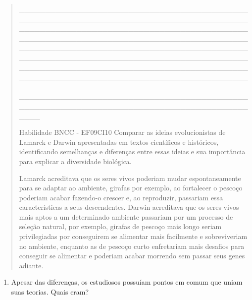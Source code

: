 \begin{quote}
\_\_\_\_\_\_\_\_\_\_\_\_\_\_\_\_\_\_\_\_\_\_\_\_\_\_\_\_\_\_\_\_\_\_\_\_\_\_\_\_\_\_\_\_\_\_\_\_\_\_\_\_\_\_\_\_\_\_\_\_\_\_\_\_\_\_\_\_\_\_\_\_\_\_\_\_\_\_\_\_\_\_\_\_\_\_\_\_\_\_\_\_\_\_\_\_\_\_\_\_\_\_\_\_\_\_\_\_\_\_\_\_\_\_\_\_\_\_\_\_\_\_\_\_\_\_\_\_\_\_\_\_\_\_\_\_\_\_\_\_\_\_\_\_\_\_\_\_\_\_\_\_\_\_\_\_\_\_\_\_\_\_\_\_\_\_\_\_\_\_\_\_\_\_\_\_\_\_\_\_\_\_\_\_\_\_\_\_\_\_\_\_\_\_\_\_\_\_\_\_\_\_\_\_\_\_\_\_\_\_\_\_\_\_\_\_\_\_\_\_\_\_\_\_\_\_\_\_\_\_\_\_\_\_\_\_\_\_\_\_\_\_\_\_\_\_\_\_\_\_\_\_\_\_\_\_\_\_\_\_\_\_\_\_\_\_\_\_\_\_\_\_\_\_\_\_\_\_\_\_\_\_\_\_\_\_\_\_\_\_\_\_\_\_\_\_\_\_\_\_\_\_\_\_\_\_\_\_\_\_\_\_\_\_\_\_\_\_\_\_\_\_\_\_\_\_\_\_\_\_\_\_\_\_\_\_\_\_\_\_\_\_\_\_\_\_\_\_\_\_\_\_\_\_\_\_\_\_\_\_\_\_\_\_\_\_\_\_\_\_\_\_\_\_\_\_\_\_\_\_\_\_\_\_\_\_\_\_\_\_\_\_\_\_\_\_\_\_\_\_\_\_\_\_\_\_\_\_\_\_\_\_\_\_\_\_\_\_\_\_\_\_\_\_\_\_\_\_\_\_\_\_\_\_\_\_\_\_\_\_\_\_\_\_\_\_\_\_\_\_\_\_\_\_\_\_\_\_\_\_\_\_\_\_\_\_\_\_\_\_\_\_\_\_\_\_\_\_\_\_\_\_\_\_\_\_\_\_

Habilidade BNCC - EF09CI10 Comparar as ideias evolucionistas de Lamarck
e Darwin apresentadas em textos científicos e históricos, identificando
semelhanças e diferenças entre essas ideias e sua importância para
explicar a diversidade biológica.

Lamarck acreditava que os seres vivos poderiam mudar espontaneamente
para se adaptar ao ambiente, girafas por exemplo, ao fortalecer o
pescoço poderiam acabar fazendo-o crescer e, ao reproduzir, passariam
essa características a seus descendentes. Darwin acreditava que os seres
vivos mais aptos a um determinado ambiente passariam por um processo de
seleção natural, por exemplo, girafas de pescoço mais longo seriam
privilegiadas por conseguirem se alimentar mais facilmente e
sobreviveriam no ambiente, enquanto as de pescoço curto enfretariam mais
desafios para conseguir se alimentar e poderiam acabar morrendo sem
passar seus genes adiante.
\end{quote}

\begin{enumerate}
\def\labelenumi{\alph{enumi})}
\item
  Apesar das diferenças, os estudiosos possuíam pontos em comum que
  uniam suas teorias. Quais eram?
\end{enumerate}

